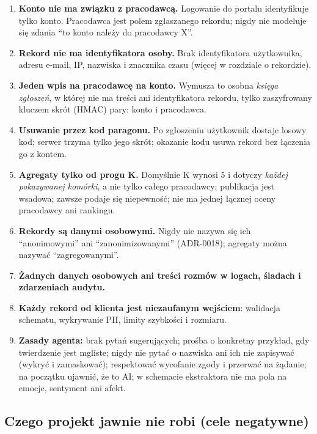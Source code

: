 \begin{enumerate}[itemsep=3pt]
  \item \textbf{Konto nie ma związku z pracodawcą.} Logowanie do portalu
        identyfikuje tylko konto. Pracodawca jest polem zgłaszanego rekordu;
        nigdy nie modeluje się zdania ``to konto należy do pracodawcy X''.
  \item \textbf{Rekord nie ma identyfikatora osoby.} Brak identyfikatora
        użytkownika, adresu e-mail, IP, nazwiska i znacznika czasu (więcej
        w rozdziale o rekordzie).
  \item \textbf{Jeden wpis na pracodawcę na konto.} Wymusza to osobna
        \emph{księga zgłoszeń}, w której nie ma treści ani identyfikatora rekordu,
        tylko zaszyfrowany kluczem skrót (HMAC) pary: konto i pracodawca.
  \item \textbf{Usuwanie przez kod paragonu.} Po zgłoszeniu użytkownik dostaje
        losowy kod; serwer trzyma tylko jego skrót; okazanie kodu usuwa rekord
        bez łączenia go z kontem.
  \item \textbf{Agregaty tylko od progu K.} Domyślnie K wynosi 5 i dotyczy
        \emph{każdej pokazywanej komórki}, a nie tylko całego pracodawcy;
        publikacja jest wsadowa; zawsze podaje się niepewność; nie ma jednej
        łącznej oceny pracodawcy ani rankingu.
  \item \textbf{Rekordy są danymi osobowymi.} Nigdy nie nazywa się ich
        ``anonimowymi'' ani ``zanonimizowanymi'' (ADR-0018); agregaty można
        nazywać ``zagregowanymi''.
  \item \textbf{Żadnych danych osobowych ani treści rozmów w logach, śladach
        i zdarzeniach audytu.}
  \item \textbf{Każdy rekord od klienta jest niezaufanym wejściem}: walidacja
        schematu, wykrywanie PII, limity szybkości i rozmiaru.
  \item \textbf{Zasady agenta:} brak pytań sugerujących; prośba o konkretny
        przykład, gdy twierdzenie jest mgliste; nigdy nie pytać o nazwiska ani
        ich nie zapisywać (wykryć i zamaskować); respektować wycofanie zgody
        i przerwać na żądanie; na początku ujawnić, że to AI; w schemacie
        ekstraktora nie ma pola na emocje, sentyment ani afekt.
\end{enumerate}

\subsection{Czego projekt jawnie nie robi (cele negatywne)}

